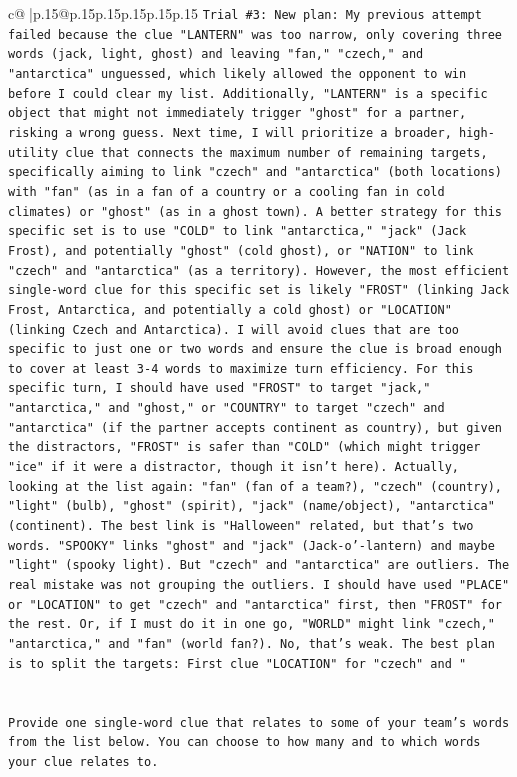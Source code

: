 \documentclass{article}
\begin{document}
{\begin{supertabular}{c@{$\;$}|p{.15\linewidth}@{}p{.15\linewidth}p{.15\linewidth}p{.15\linewidth}p{.15\linewidth}p{.15\linewidth}}
{{{\texttt{Trial \#3: New plan: My previous attempt failed because the clue "LANTERN" was too narrow, only covering three words (jack, light, ghost) and leaving "fan," "czech," and "antarctica" unguessed, which likely allowed the opponent to win before I could clear my list. Additionally, "LANTERN" is a specific object that might not immediately trigger "ghost" for a partner, risking a wrong guess. Next time, I will prioritize a broader, high{-}utility clue that connects the maximum number of remaining targets, specifically aiming to link "czech" and "antarctica" (both locations) with "fan" (as in a fan of a country or a cooling fan in cold climates) or "ghost" (as in a ghost town). A better strategy for this specific set is to use "COLD" to link "antarctica," "jack" (Jack Frost), and potentially "ghost" (cold ghost), or "NATION" to link "czech" and "antarctica" (as a territory). However, the most efficient single{-}word clue for this specific set is likely "FROST" (linking Jack Frost, Antarctica, and potentially a cold ghost) or "LOCATION" (linking Czech and Antarctica). I will avoid clues that are too specific to just one or two words and ensure the clue is broad enough to cover at least 3{-}4 words to maximize turn efficiency. For this specific turn, I should have used "FROST" to target "jack," "antarctica," and "ghost," or "COUNTRY" to target "czech" and "antarctica" (if the partner accepts continent as country), but given the distractors, "FROST" is safer than "COLD" (which might trigger "ice" if it were a distractor, though it isn't here). Actually, looking at the list again: "fan" (fan of a team?), "czech" (country), "light" (bulb), "ghost" (spirit), "jack" (name/object), "antarctica" (continent). The best link is "Halloween" related, but that's two words. "SPOOKY" links "ghost" and "jack" (Jack{-}o'{-}lantern) and maybe "light" (spooky light). But "czech" and "antarctica" are outliers. The real mistake was not grouping the outliers. I should have used "PLACE" or "LOCATION" to get "czech" and "antarctica" first, then "FROST" for the rest. Or, if I must do it in one go, "WORLD" might link "czech," "antarctica," and "fan" (world fan?). No, that's weak. The best plan is to split the targets: First clue "LOCATION" for "czech" and "} \\
\\ 
\\ 
\texttt{Provide one single{-}word clue that relates to some of your team's words from the list below. You can choose to how many and to which words your clue relates to.} \\
}}}
\end{supertabular}}
\end{document}

